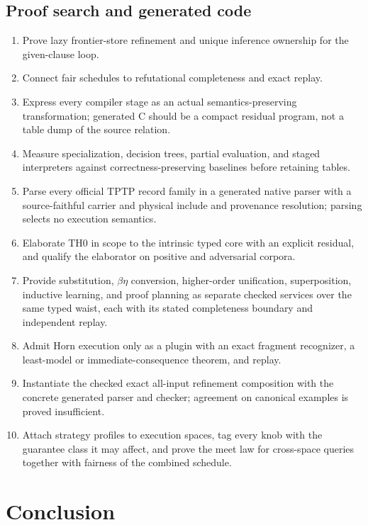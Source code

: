 \documentclass[11pt]{article}
\theoremstyle{definition}
\theoremstyle{remark}
\begin{document}
\subsection{Proof search and generated code}

\begin{enumerate}
\item Prove lazy frontier-store refinement and unique inference ownership for the
  given-clause loop.
\item Connect fair schedules to refutational completeness and exact replay.
\item Express every compiler stage as an actual semantics-preserving
  transformation; generated C should be a compact residual program, not a table
  dump of the source relation.
\item Measure specialization, decision trees, partial evaluation, and staged
  interpreters against correctness-preserving baselines before retaining tables.
\item Parse every official TPTP record family in a generated native parser with
  a source-faithful carrier and physical include and provenance resolution;
  parsing selects no execution semantics.
\item Elaborate TH0 in scope to the intrinsic typed core with an explicit
  residual, and qualify the elaborator on positive and adversarial corpora.
\item Provide substitution, $\beta\eta$ conversion, higher-order unification,
  superposition, inductive learning, and proof planning as separate checked
  services over the same typed waist, each with its stated completeness
  boundary and independent replay.
\item Admit Horn execution only as a plugin with an exact fragment recognizer,
  a least-model or immediate-consequence theorem, and replay.
\item Instantiate the checked exact all-input refinement composition with the
  concrete generated parser and checker; agreement on canonical examples is
  proved insufficient.
\item Attach strategy profiles to execution spaces, tag every knob with the
  guarantee class it may affect, and prove the meet law for cross-space
  queries together with fairness of the combined schedule.
\end{enumerate}

\section{Conclusion}
\end{document}
